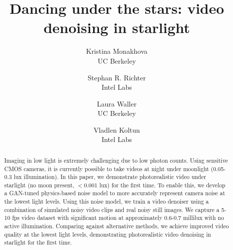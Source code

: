 \documentclass[final]{cvpr}
\begin{document}
\title{Dancing under the stars: video denoising in starlight}


\author{Kristina Monakhova\\
UC Berkeley\\
\and
Stephan R. Richter\\
Intel Labs \\
\and
Laura Waller\\
UC Berkeley \\
\and
Vladlen Koltun\\
Intel Labs \\
}

\makeatletter
\g@addto@macro{}
\makeatother

\maketitle
\thispagestyle{empty}


\begin{abstract}
Imaging in low light is extremely challenging due to low photon counts. Using sensitive CMOS cameras, it is currently possible to take videos at night under moonlight (0.05-0.3 lux illumination). In this paper, we demonstrate photorealistic video under starlight (no moon present, $<$0.001 lux) for the first time. To enable this, we develop a GAN-tuned physics-based noise model to more accurately represent camera noise at the lowest light levels. Using this noise model, we train a video denoiser using a combination of simulated noisy video clips and real noisy still images. We capture a 5-10 fps video dataset with significant motion at approximately 0.6-0.7 millilux with no active illumination.  Comparing against alternative methods, we achieve improved video quality at the lowest light levels, demonstrating  photorealistic video denoising in starlight for the first time. 
\vspace{-4mm}
\end{abstract}
\end{document}
